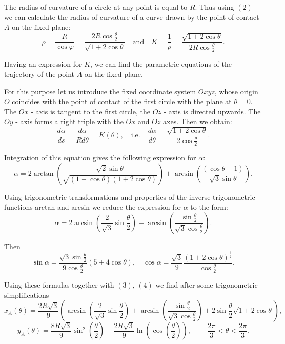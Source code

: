 \documentclass[10pt]{enoc2011}
\begin{document}
The radius of curvature of a circle at any point is equal to $R$. Thus using $(2)$ we can calculate the radius of curvature of a curve drawn by the point of contact $A$ on the fixed plane:
$$
\rho=\frac{R}{\cos\varphi}=\frac{2R\cos\frac{\theta}{2}}{\sqrt{1+2\cos\theta}}\quad\mbox{and}\quad
K=\frac{1}{\rho}=\frac{\sqrt{1+2\cos\theta}}{2R\cos\frac{\theta}{2}}.
$$

Having an expression for $K$, we can find the parametric equations of the trajectory of the point $A$ on the fixed plane.

For this purpose let us introduce the fixed coordinate system $Oxyz$, whose origin $O$ coincides with the point of contact of the first circle with the plane at $\theta=0$. The $Ox$ - axis is tangent to the first circle, the $Oz$ - axis is directed upwards. The $Oy$ - axis forms a right triple with the $Ox$ and $Oz$ axes. Then we obtain:
$$
\frac{d\alpha}{ds}=\frac{d\alpha}{Rd\theta}=K\left(\theta\right),\quad\mbox{i.e.}\quad \frac{d\alpha}{d\theta}=\frac{\sqrt{1+2\cos\theta}}{2\cos\frac{\theta}{2}}.
$$

Integration of this equation gives the following expression for $\alpha$:
$$
\alpha=2\arctan\left(\frac{\sqrt{2}\sin\theta}{\sqrt{\left(1+\cos\theta\right)\left(1+2\cos\theta\right)}}\right)+
\arcsin\left(\frac{\left(\cos\theta-1\right)}{\sqrt{3}\sin\theta}\right).
$$

Using trigonometric transformations and properties of the inverse trigonometric functions arctan and arcsin we reduce the expression for $\alpha$ to the form:
$$
\alpha=2\arcsin\left(\frac{2}{\sqrt{3}}\sin\frac{\theta}{2}\right)-\arcsin\left(\frac{\sin\frac{\theta}{2}}
{\sqrt{3}\cos\frac{\theta}{2}}\right).
$$

Then
$$
\sin\alpha=\frac{\sqrt{3}\sin\frac{\theta}{2}}{9\cos\frac{\theta}{2}}\left(5+4\cos\theta\right),\quad
\cos\alpha=\frac{\sqrt{3}}{9}\frac{\left(1+2\cos\theta\right)^{\frac{3}{2}}}
{\cos\frac{\theta}{2}}.
$$

Using these formulas together with $(3)$, $(4)$ we find after some trigonometric simplifications
$$
x_A\left(\theta\right)\!=\!\frac{2R\sqrt{3}}{9}\left(\arcsin\left(\frac{2}{\sqrt{3}}\sin\frac{\theta}{2}\right)\!+\!
\arcsin\left(\frac{\sin\frac{\theta}{2}}{\sqrt{3}\cos\frac{\theta}{2}}\right)\!+\!
2\sin\frac{\theta}{2}\sqrt{1\!+\!2\cos\theta}\right),
$$
$$
y_A\left(\theta\right)=\frac{8R\sqrt{3}}{9}\sin^2\left(\frac{\theta}{2}\right)-\frac{2R\sqrt{3}}{9}\ln\left(\cos\left(\frac{\theta}{2}\right)\right),
\quad -\frac{2\pi}{3}<\theta<\frac{2\pi}{3}.
$$
\end{document}
